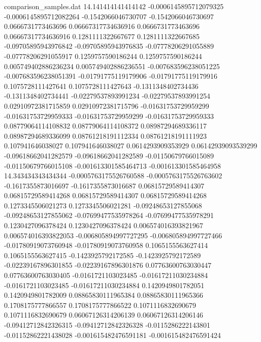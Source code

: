 \begin{filecontents}{comparison_samples.dat}
14.141414141414142  -0.0006145895712079325  -0.0006145895712082264  -0.1542066046730707    -0.1542066046730697    0.0666731773463696     0.06667317734636916    0.0666731773463696     0.06667317734636916    0.1281111322667677     0.1281111322667685     -0.09705895943976842    -0.09705895943976835    -0.07778206291055889   -0.07778206291055917   0.1259757590186244      0.1259757590186244      0.005749402886236234    0.005749402886236551    -0.007683596238051225   -0.007683596238051391   -0.01791775119179906    -0.01791775119179916    0.1075728111427641      0.1075728111427643      -0.1311348402734436     -0.1311348402734441     -0.02279537893991234   -0.02279537893991254   0.02910972381715859    0.02910972381715796    -0.01631753729959299    -0.01631753729959333    -0.01631753729959299    -0.01631753729959333    0.08779064114108832    0.08779064114108372    0.08987294689336117     0.08987294689336099     0.08761218191112334    0.08761218191111923    0.107941646038027       0.107941646038027       0.0614293909353929      0.06142939093539299     -0.09618662041282579   -0.09618662041282589   -0.01150679766015089   -0.01150679766015108   -0.001613301585464713   -0.001613301585464958 
14.343434343434344  -0.0005763175526760588  -0.0005763175526763602  -0.1617355873016697    -0.1617355873016687    0.06815729589414307    0.06815729589414268    0.06815729589414307    0.06815729589414268    0.1273345506021273     0.1273345506021281     -0.09248653127855068    -0.09248653127855062    -0.07699477535978264   -0.07699477535978291   0.1230427096378424      0.1230427096378424      0.006574016393821967    0.006574016393822053    -0.006805894997727295   -0.006805894997727466   -0.01780919073760948    -0.01780919073760958    0.1065155563627414      0.1065155563627415      -0.1423925792172585     -0.1423925792172589     -0.02239167896301855   -0.02239167896301876   0.07763600763030447    0.07763600763030405    -0.0161721103023485     -0.01617211030234884    -0.0161721103023485     -0.01617211030234884    0.1420949801782051     0.1420949801782009     0.08865830111965384     0.08865830111965366     0.1708175777866557     0.1708175777866522     0.1071116832690679      0.1071116832690679      0.06067126314206139     0.06067126314206146     -0.09412712842326315   -0.09412712842326328   -0.0115286222143801    -0.01152862221438028   -0.001615482476591181   -0.001615482476591424 

\end{filecontents}
